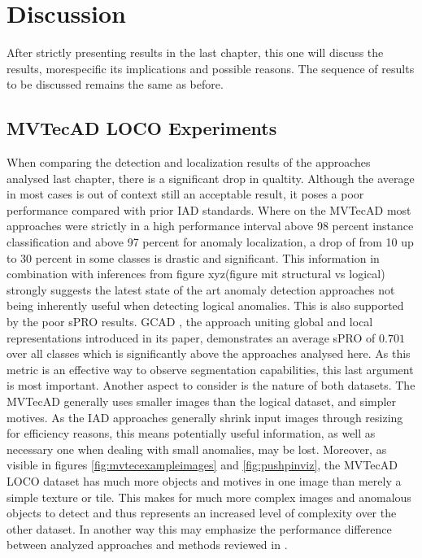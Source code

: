 \chapter{Discussion}
\label{chap:results}

After strictly presenting results in the last chapter, this one will discuss the results, morespecific its implications and possible reasons. 
The sequence of results to be discussed remains the same as before.


\section{MVTecAD LOCO Experiments}
\label{sec:locoresultssota}

When comparing the detection and localization results of the approaches analysed last chapter, there is a significant drop in qualtity. 
Although the average in most cases is out of context still an acceptable result, it poses a poor performance compared with prior 
IAD standards. Where on the MVTecAD \cite{MVTEC_Bergmann_2021} most approaches were strictly in a high performance interval above 98 percent 
instance classification and above 97 percent for anomaly localization, a drop of from 10 up to 30 percent in some classes is drastic and significant. 
This information in combination with inferences from figure xyz(figure mit structural vs logical) strongly suggests the latest state of 
the art anomaly detection approaches not being inherently useful when detecting logical anomalies. This is also supported by the 
poor sPRO results. GCAD \cite{LOCODentsAndScratchesBergmann2022}, the approach uniting global and local representations introduced in its 
paper, demonstrates an average sPRO of $0.701$ over all classes which is significantly above the approaches analysed here. As this metric 
is an effective way to observe segmentation capabilities, this last argument is most important. \newline
Another aspect to consider is the nature of both datasets. The MVTecAD \cite{MVTEC_Bergmann_2021} generally uses smaller images than the 
logical dataset, and simpler motives. As the IAD approaches generally shrink input images through resizing for efficiency reasons, 
this means potentially useful information, as well as necessary one when dealing with small anomalies, may be lost. 
Moreover, as visible in figures \ref{fig:mvtecexampleimages} and \ref{fig:pushpinviz}, the MVTecAD LOCO dataset 
has much more objects and motives in one image than merely a simple texture or tile. This makes for much more complex images and anomalous objects 
to detect and thus represents an increased level of complexity over the other dataset. In another way this may emphasize the performance 
difference between analyzed approaches and methods reviewed in \cite{LOCODentsAndScratchesBergmann2022}. \newline

